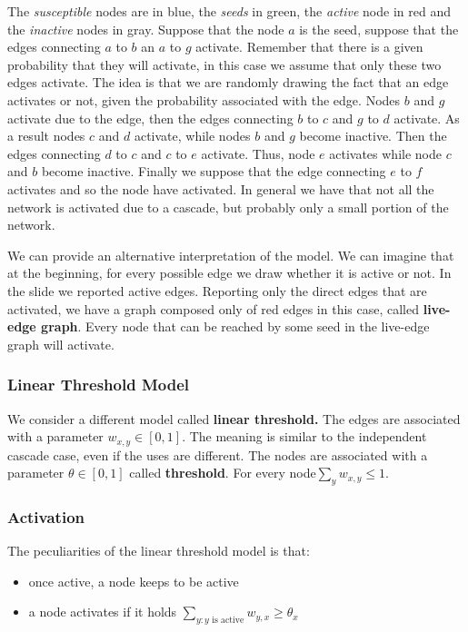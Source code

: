 \documentclass[10pt,a4paper]{article}
\begin{document}
The \textit{susceptible} nodes are in blue, the \textit{seeds} in green, the
\textit{active} node in red and the \textit{inactive} nodes in gray. Suppose that the node $a$ is the seed, suppose that the edges connecting $a$ to $b$ an $a$ to $g$ activate. Remember that there is a given probability that they will activate, in this case we assume that only these two edges activate. The idea is that we are randomly drawing the fact that an edge activates or not, given the probability associated with the edge. Nodes $b$ and $g$ activate due to the edge, then the edges connecting $b$ to $c$ and $g$ to $d$ activate. As a result nodes $c$ and $d$ activate, while nodes $b$ and $g$ become inactive. Then the edges connecting $d$ to $c$ and $c$ to $e$ activate. Thus, node $e$ activates while node $c$ and $b$ become inactive. Finally we suppose that the edge connecting $e$ to $f$ activates and so the node have activated. In general we have that not all the network is activated due to a cascade, but probably only a small portion of the network.

We can provide an alternative interpretation of the model. We can imagine that at the beginning, for every possible edge we draw whether it is active or not. In the slide we reported active edges. Reporting only the direct edges that are activated, we have a graph composed only of red edges in this case, called \textbf{live-edge graph}. Every node that can be reached by some seed in the live-edge graph will activate.

\subsubsection{Linear Threshold Model}\label{linear-threshold-model}

We consider a different model called \textbf{linear threshold.} The edges are associated with a parameter $w_{x,y} \in [0,1]$. The meaning is similar to the independent cascade case, even if the uses are different. The nodes are associated with a parameter $\theta \in [0,1]$ called \textbf{threshold}. For every node$\sum_{y}{w_{x,y} \le 1}$.

\subsubsection{Activation}\label{activation}

The peculiarities of the linear threshold model is that:

\begin{itemize}
\item once active, a node keeps to be active
\item a node activates if it holds $\sum_{y: y \text{ is active}}{w_{y,x} \ge \theta_{x}}$
\end{itemize}
\end{document}

